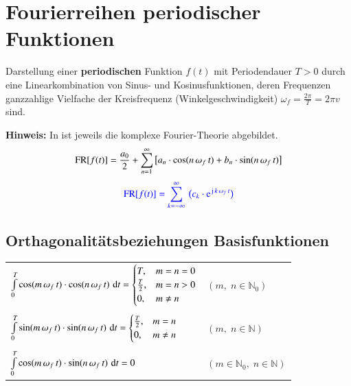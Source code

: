\section{Fourierreihen periodischer Funktionen}

Darstellung einer \textbf{periodischen} Funktion $f(t)$ mit Periodendauer $T > 0$ durch eine Linearkombination von Sinus- und Kosinusfunktionen,
deren Frequenzen ganzzahlige Vielfache der Kreisfrequenz (Winkelgeschwindigkeit) $\omega_f = \frac{2 \pi}{T} = 2 \pi v$ sind.

\smallskip

\textbf{Hinweis:} In  ist jeweils die komplexe Fourier-Theorie abgebildet.
\[\mathop{} \! \mathrm{FR}[f(t)] = \frac{a_0}{2} + \sum\limits _{n=1}^\infty \big[ a_n \cdot \cos(n \, \omega_f \, t) + b_n \cdot \sin(n \, \omega_f \, t) \big] \]
\[\cbl{\FR[f(t)] = \sum\limits _{k = -\infty}^\infty \: \big( c_k \cdot \e^{\jimg \, k \, \omega_f \, t} \big)} \]


\subsection{Orthagonalitätsbeziehungen Basisfunktionen}

\begin{tabular}{ll}
    $\int \limits_{0}^{T} \cos(m \, \omega_f \, t) \cdot \cos(n \, \omega_f \, t) \, \diff t =
        \begin{cases}
            T,           & m = n = 0 \\

            \frac{T}{2}, & m = n > 0 \\
            0,           & m \neq n
        \end{cases}$
     & $(m, \; n \in \mathbb{N}_0)$                \\
    \\
    $\int \limits_{0}^{T} \sin(m \, \omega_f \, t) \cdot \sin(n \, \omega_f \, t) \, \diff t =
        \begin{cases}
            \frac{T}{2}, & m = n    \\
            0,           & m \neq n
        \end{cases} $
     & $(m, \; n \in \mathbb{N})$                  \\
    \\
    $\int \limits_{0}^{T} \cos(m \, \omega_f \, t) \cdot \sin(n \, \omega_f \, t) \, \diff t = 0$
     & $(m \in \mathbb{N}_0, \; n \in \mathbb{N})$
\end{tabular}


